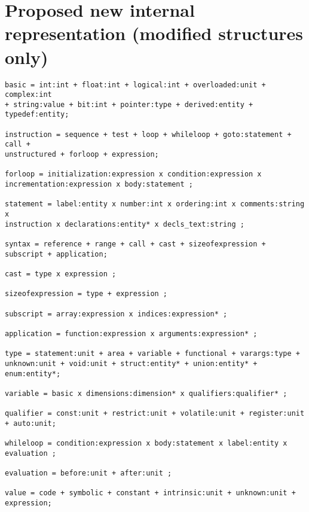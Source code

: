 \documentclass[a4paper]{report}
\begin{document}
\chapter{Proposed new internal representation (modified structures only)}

\begin{verbatim}
basic = int:int + float:int + logical:int + overloaded:unit + complex:int 
+ string:value + bit:int + pointer:type + derived:entity + typedef:entity;

instruction = sequence + test + loop + whileloop + goto:statement + call +
unstructured + forloop + expression;

forloop = initialization:expression x condition:expression x
incrementation:expression x body:statement ;

statement = label:entity x number:int x ordering:int x comments:string x
instruction x declarations:entity* x decls_text:string ;

syntax = reference + range + call + cast + sizeofexpression + subscript + application;

cast = type x expression ;

sizeofexpression = type + expression ;

subscript = array:expression x indices:expression* ;

application = function:expression x arguments:expression* ;

type = statement:unit + area + variable + functional + varargs:type +
unknown:unit + void:unit + struct:entity* + union:entity* + enum:entity*;

variable = basic x dimensions:dimension* x qualifiers:qualifier* ;

qualifier = const:unit + restrict:unit + volatile:unit + register:unit + auto:unit;

whileloop = condition:expression x body:statement x label:entity x
evaluation ;

evaluation = before:unit + after:unit ;

value = code + symbolic + constant + intrinsic:unit + unknown:unit + expression;
\end{verbatim}



\end{document}
